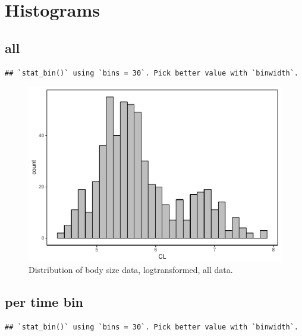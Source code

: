 \documentclass[]{article}
\begin{document}
\newpage

\section{Histograms}\label{histograms}

\subsection{all}\label{all}

\begin{verbatim}
## `stat_bin()` using `bins = 30`. Pick better value with `binwidth`.
\end{verbatim}

\begin{figure}[htbp]
\centering
\includegraphics{MA_JJ_files/figure-latex/Histograms of body size data, all-1.pdf}
\caption{Distribution of body size data, logtransformed, all data.}
\end{figure}

\newpage

\subsection{per time bin}\label{per-time-bin}

\begin{verbatim}
## `stat_bin()` using `bins = 30`. Pick better value with `binwidth`.
\end{verbatim}
\end{document}
